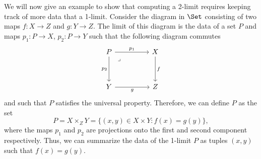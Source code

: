 \begin{example}
    We will now give an example to show that computing a 2-limit requires keeping track of more data that a 1-limit. Consider the diagram in $\Set$ consisting of two maps $f: X \to Z$ and $g: Y \to Z$. The limit of this diagram is the data of a set $P$ and maps $p_1: P \to X$, $p_2: P \to Y$ such that the following diagram commutes
    \[\begin{tikzcd}
    	P && X \\
    	\\
    	Y && Z
    	\arrow["{p_1}", from=1-1, to=1-3]
    	\arrow["{p_2}"', from=1-1, to=3-1]
    	\arrow["\lrcorner"{anchor=center, pos=0.125}, draw=none, from=1-1, to=3-3]
    	\arrow["f", from=1-3, to=3-3]
    	\arrow["g"', from=3-1, to=3-3]
    \end{tikzcd}\]
    and such that $P$ satisfies the universal property. Therefore, we can define $P$ as the set
    $$
    P = X \times_Z Y = \{ (x,y) \in X \times Y : f(x) = g(y) \},
    $$
    where the maps $p_1$ and $p_2$ are projections onto the first and second component respectively. Thus, we can summarize the data of the 1-limit $P$ as tuples $(x,y)$ such that $f(x) = g(y)$. 
    

\end{example}

